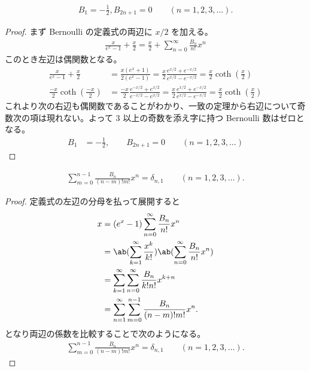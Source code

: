 \documentclass[uplatex,diffipdfmx,a4paper,11pt]{jlreq}
\begin{document}
\begin{proposition}
  \begin{align}
    B_1 = -\frac{1}{2}, B_{2n+1} = 0 \qquad (n = 1,2,3,\ldots).
  \end{align}
\end{proposition}
\begin{proof}
  まず Bernoulli の定義式の両辺に $x/2$ を加える。
  \begin{align}
    \frac{x}{e^x - 1} + \frac{x}{2} = \frac{x}{2} + \sum_{n=0}^{\infty}\frac{B_n}{n!}x^n
  \end{align}
  このとき左辺は偶関数となる。
  \begin{align}
    \frac{x}{e^x - 1} + \frac{x}{2} & = \frac{x(e^x + 1)}{2(e^x - 1)} = \frac{x}{2}\frac{e^{x/2} + e^{-x/2}}{e^{x/2} - e^{-x/2}} = \frac{x}{2}\coth(\frac{x}{2})                             \\
    \frac{-x}{2}\coth(\frac{-x}{2}) & = \frac{-x}{2}\frac{e^{-x/2} + e^{x/2}}{e^{-x/2} - e^{x/2}} = \frac{x}{2}\frac{e^{x/2} + e^{-x/2}}{e^{x/2} - e^{-x/2}} = \frac{x}{2}\coth(\frac{x}{2})
  \end{align}
  これより次の右辺も偶関数であることがわかり、一致の定理から右辺について奇数次の項は現れない。よって 3 以上の奇数を添え字に持つ Bernoulli 数はゼロとなる。
  \begin{align}
    B_1 & = -\frac{1}{2}, \qquad B_{2n+1} = 0 \qquad (n = 1,2,3,\ldots)
  \end{align}
\end{proof}
\begin{theorem}
  \begin{align}
    \sum_{m=0}^{n-1}\frac{B_n}{(n - m)!m!}x^n = \delta_{n,1} \qquad (n = 1,2,3,\ldots).
  \end{align}
\end{theorem}
\begin{proof}
  定義式の左辺の分母を払って展開すると
  \begin{align}
    x & = (e^x - 1)\sum_{n=0}^{\infty}\frac{B_n}{n!}x^n                                   \\
      & = \ab(\sum_{k=1}^{\infty}\frac{x^k}{k!})\ab(\sum_{n=0}^{\infty}\frac{B_n}{n!}x^n) \\
      & = \sum_{k=1}^{\infty}\sum_{n=0}^{\infty}\frac{B_n}{k!n!}x^{k+n}                   \\
      & = \sum_{n=1}^{\infty}\sum_{m=0}^{n-1}\frac{B_n}{(n - m)!m!}x^n.
  \end{align}
  となり両辺の係数を比較することで次のようになる。
  \begin{align}
    \sum_{m=0}^{n-1}\frac{B_n}{(n - m)!m!}x^n = \delta_{n,1} \qquad (n = 1,2,3,\ldots).
  \end{align}
\end{proof}
\end{document}
